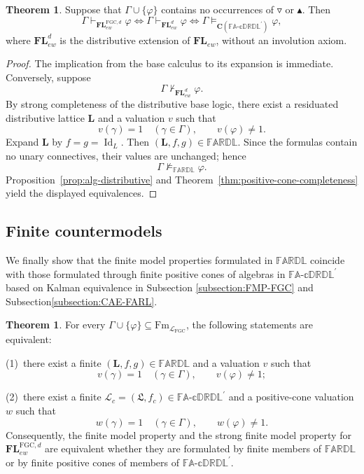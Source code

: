\documentclass[final,12pt,times]{elsarticle}
\theoremstyle{plain}
\theoremstyle{definition}
\newtheorem{theorem}[definition]{Theorem}
\theoremstyle{break}
\newcommand{\FARDL}{\mathbb{FARDL}}
\newcommand{\CFADp}{\mathbb{FA\text{-}cDRDL}^{\prime}}
\newcommand{\FLew}{\mathbf{FL}_{ew}}
\newcommand{\Cfun}{\mathbf C}
\newcommand{\Id}{\operatorname{Id}}
\begin{document}
\begin{theorem}
\label{thm:positive-conservativity}
Suppose that \(\Gamma\cup\{\varphi\}\) contains no occurrences of
\(\triangledown\) or \(\blacktriangle\).  Then
\[
 \Gamma\vdash_{\mathbf{FL}^{\mathrm{FGC},d}_{ew}}\varphi
 \Longleftrightarrow
 \Gamma\vdash_{\mathbf{FL}^{d}_{ew}}\varphi
 \Longleftrightarrow
 \Gamma\models_{\Cfun(\CFADp)}\varphi,
\]
where \(\mathbf{FL}^{d}_{ew}\) is the distributive extension of
\(\FLew\), without an involution axiom.
\end{theorem}

\begin{proof}
The implication from the base calculus to its expansion is immediate.
Conversely, suppose
\[
 \Gamma\nvdash_{\mathbf{FL}^{d}_{ew}}\varphi.
\]
By strong completeness of the distributive base logic, there exist a
residuated distributive lattice \(\mathbf L\) and a valuation \(v\) such that
\[
 v(\gamma)=1\quad(\gamma\in\Gamma),
 \qquad
 v(\varphi)\neq1.
\]
Expand \(\mathbf L\) by \(f=g=\Id_L\).  Then
\((\mathbf L,f,g)\in\FARDL\).  Since the formulas contain no unary
connectives, their values are unchanged; hence
\[
 \Gamma\not\models_{\FARDL}\varphi.
\]
Proposition~\ref{prop:alg-distributive} and
Theorem~\ref{thm:positive-cone-completeness} yield the displayed
equivalences.
\end{proof}

\subsection{Finite countermodels}
\label{subsec:finite-countermodels}

We finally show that the finite model properties formulated in \(\FARDL\) coincide with those formulated through finite positive cones of algebras in \(\CFADp\) based on Kalman equivalence in Subsection \ref{subsection:FMP-FGC} and Subsection\ref{subsection:CAE-FARL}.

\begin{theorem}
\label{thm:finite-countermodel-transfer}
For every \(\Gamma\cup\{\varphi\}\subseteq
\mathrm{Fm}_{\mathcal L_{\mathrm{FGC}}}\), the following statements are equivalent:

(1)\ there exist a finite \((\mathbf L,f,g)\in\FARDL\) and a valuation
      \(v\) such that
      \[
       v(\gamma)=1\quad(\gamma\in\Gamma),
       \qquad
       v(\varphi)\neq1;
      \]
      
(2)\ there exist a finite
      \(\mathcal{\mathscr L}_c=(\boldsymbol{\mathfrak L},f_c)\in\CFADp\)
      and a positive-cone valuation \(w\) such that
      \[
       w(\gamma)=1\quad(\gamma\in\Gamma),
       \qquad
       w(\varphi)\neq1.
      \]
Consequently, the finite model property and the strong finite model property
for \(\mathbf{FL}^{\mathrm{FGC},d}_{ew}\) are equivalent whether they are
formulated by finite members of \(\FARDL\) or by finite positive cones of
members of \(\CFADp\).
\end{theorem}
\end{document}
